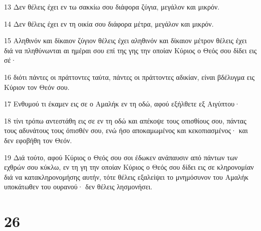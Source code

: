 \par 13 Δεν θέλεις έχει εν τω σακκίω σου διάφορα ζύγια, μεγάλον και μικρόν.
\par 14 Δεν θέλεις έχει εν τη οικία σου διάφορα μέτρα, μεγάλον και μικρόν.
\par 15 Αληθινόν και δίκαιον ζύγιον θέλεις έχει αληθινόν και δίκαιον μέτρον θέλεις έχει διά να πληθύνωνται αι ημέραι σου επί της γης την οποίαν Κύριος ο Θεός σου δίδει εις σέ·
\par 16 διότι πάντες οι πράττοντες ταύτα, πάντες οι πράττοντες αδικίαν, είναι βδέλυγμα εις Κύριον τον Θεόν σου.
\par 17 Ενθυμού τι έκαμεν εις σε ο Αμαλήκ εν τη οδώ, αφού εξήλθετε εξ Αιγύπτου·
\par 18 τίνι τρόπω αντεστάθη εις σε εν τη οδώ και απέκοψε τους οπισθίους σου, πάντας τους αδυνάτους τους όπισθέν σου, ενώ ήσο αποκαμωμένος και κεκοπιασμένος· και δεν εφοβήθη τον Θεόν.
\par 19 Διά τούτο, αφού Κύριος ο Θεός σου σοι έδωκεν ανάπαυσιν από πάντων των εχθρών σου κύκλω, εν τη γη την οποίαν Κύριος ο Θεός σου δίδει εις σε κληρονομίαν διά να κατακληρονομήσης αυτήν, τότε θέλεις εξαλείψει το μνημόσυνον του Αμαλήκ υποκάτωθεν του ουρανού· δεν θέλεις λησμονήσει.

\chapter{26}


